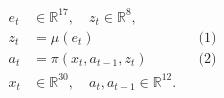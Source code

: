 \documentclass[border=7pt]{standalone}
\begin{document}
\color{ink}
$\displaystyle \begin{aligned}
e_t&\in\mathbb R^{17},\quad z_t\in\mathbb R^8,\\[3pt]
z_t&=\mu(e_t) &&\text{(1)}\\[3pt]
a_t&=\pi(x_t,a_{t-1},z_t) &&\text{(2)}\\[3pt]
x_t&\in\mathbb R^{30},\quad a_t,a_{t-1}\in\mathbb R^{12}.
\end{aligned}$
\end{document}
